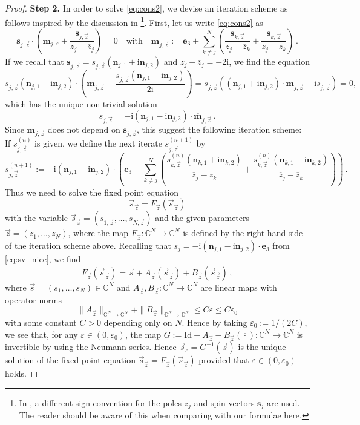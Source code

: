 \documentclass[11pt,reqno]{amsart}
\theoremstyle{definition}
\theoremstyle{remark}
\theoremstyle{remark}
\numberwithin{equation}{section}
\newcommand{\C}{\mathbb{C}}
\newcommand{\ov}{\overline}
\newcommand{\sv}{\mathbf{s}}
\newcommand{\nv}{\mathbf{n}}
\newcommand{\be}{\begin{equation}}
\newcommand{\ee}{\end{equation}}
\newcommand{\eps}{\varepsilon}
\newcommand{\ii}{\mathrm{i}}
\newcommand{\mv}{\mathbf{m}}
\newcommand{\id}{\mathrm{Id}}
\begin{document}
\begin{appendix}
\begin{proof}
\medskip
\textbf{Step 2.} In order to solve \eqref{eq:cons2}, we devise an iteration scheme as follows inspired by the discussion in \cite{BeKlLa-20}\footnote{In \cite{BeKlLa-20}, a different sign convention for the poles $z_j$ and spin vectors $\sv_j$ are used. The reader should be aware of this when comparing with our formulae here.}. First, let us write \eqref{eq:cons2} as
$$
\sv_{j,\vec{z}} \cdot \left ( \mv_{j,\eps} + \frac{\ov{\sv}_{j,\vec{z}}}{z_j-\ov{z}_j} \right ) = 0 \quad \mbox{with} \quad \mv_{j,\vec{z}}:= \mathbf{e}_3 + \sum_{k \neq j}^N \left ( \frac{\ov{\sv}_{k,\vec{z}}}{z_j - \ov{z}_k} + \frac{\sv_{k,\vec{z}}}{z_j - z_k} \right ) \, .
$$
If we recall that $\sv_{j,\vec{z}} = s_{j,\vec{z}}(\nv_{j,1} + \ii \nv_{j,2})$ and $z_j-\ov{z}_j=-2 \ii$, we find  the equation
$$
s_{j,\vec{z}} (\nv_{j,1} + \ii \nv_{j,2}) \cdot \left (  \mv_{j,\vec{z}} - \frac{\ov{s}_{j,\vec{z}}(\nv_{j,1} - \ii \nv_{j,2})}{2 \ii} \right ) = s_{j,\vec{z}} \left ( (\nv_{j,1} + \ii \nv_{j,2}) \cdot \mv_{j,\vec{z}} + \ii \ov{s}_{j,\vec{z}} \right ) = 0,
$$
which has the unique non-trivial solution
$$
s_{j,\vec{z}} = -\ii (\nv_{j,1} - \ii \nv_{j,2}) \cdot \ov{\mv}_{j,\vec{z}}  \, .
$$
Since $\mv_{j,\vec{z}}$ does not depend on $\sv_{j,\vec{z}}$, this suggest the following iteration scheme: If $s_{j,\vec{z}}^{(n)}$ is given, we define the next iterate $s_{j,\vec{z}}^{(n+1)}$ by 
$$
s_{j,\vec{z}}^{(n+1)} := -\ii (\nv_{j,1}- \ii \nv_{j,2}) \cdot \left ( \mathbf{e}_3 + \sum_{k \neq  j}^N \left ( \frac{s_{k,\vec{z}}^{(n)}(\nv_{k,1} + \ii \nv_{k,2})}{\ov{z}_j-z_k} + \frac{\ov{s}_{k,\vec{z}}^{(n)}(\nv_{k,1} - \ii \nv_{k,2})}{\ov{z}_j - \ov{z}_k} \right ) \right ) \, .
$$
Thus we need to solve the fixed point equation
$$
\vec{s}_{\vec{z}} = F_{\vec{z}}(\vec{s}_{\vec{z}})
$$
with the variable $\vec{s}_{\vec{z}} = (s_{1,\vec{z}}, \ldots, s_{N,\vec{z}})$ and the given parameters $\vec{z} = (z_1, \ldots, z_N)$, where the map $F_{\vec{z}} : \C^{N} \to \C^N$ is defined by the right-hand side of the iteration scheme above. Recalling that $s_j = -\ii (\nv_{j,1} - \ii \nv_{j,2}) \cdot \mathbf{e}_3$ from \eqref{eq:sv_nice}, we find
$$
F_{\vec{z}}(\vec{s}_{\vec{z}}) = \vec{s} + A_{\vec{z}} (\vec{s}_{\vec{z}}) + B_{\vec{z}} (\ov{\vec{s}}_{\vec{z}}) \, ,
$$
where $\vec{s}=(s_1, \ldots, s_N) \in \C^N$ and $A_{\vec{z}}, B_{\vec{z}} : \C^N \to \C^N$ are linear maps with operator norms 
\be \label{ineq:AB}
\| A_{\vec{z}} \|_{\C^N \to \C^N} + \| B_{\vec{z}} \|_{\C^N \to \C^N} \leq C \eps \leq C \eps_0
\ee
with some constant $C> 0$ depending only on $N$. Hence by taking $\eps_0:=1/(2C)$, we see that, for any $\eps \in (0,\eps_0)$, the map $G:=\id - A_{\vec{z}} - B_{\vec{z}}(\ov{\cdot}) : \C^N \to \C^N$ is invertible by using the Neumann series. Hence $\vec{s}_\eps = G^{-1} (\vec{s})$ is the unique solution of the fixed point equation $\vec{s}_{\vec{z}} = F_{\vec{z}}(\vec{s}_{\vec{z}})$ provided that $\eps \in (0, \eps_0)$ holds.




\end{proof}
\end{appendix}
\end{document}
